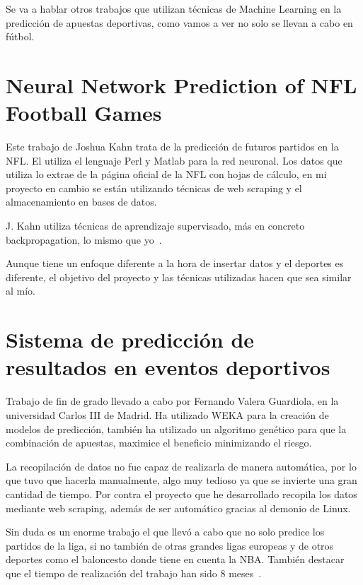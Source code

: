 
Se va a hablar otros trabajos que utilizan técnicas de Machine Learning en la predicción de apuestas deportivas, como vamos a ver no solo se llevan a cabo en fútbol.

\section{Neural Network Prediction of NFL Football Games}

Este trabajo de Joshua Kahn trata de la predicción de futuros partidos en la NFL.
El utiliza el lenguaje Perl y Matlab para la red neuronal. Los datos que utiliza lo extrae de la página oficial de la NFL con hojas de cálculo, en mi proyecto en cambio se están utilizando técnicas de web scraping y el almacenamiento en bases de datos.

J. Kahn utiliza técnicas de aprendizaje supervisado, más en concreto backpropagation, lo mismo que yo~\cite{neural_nfl}.

Aunque tiene un enfoque diferente a la hora de insertar datos y el deportes es diferente, el objetivo del proyecto y las técnicas utilizadas hacen que sea similar al mío.

\section{Sistema de predicción de resultados en eventos deportivos}

Trabajo de fin de grado llevado a cabo por Fernando Valera Guardiola, en la universidad Carlos III de Madrid. Ha utilizado WEKA para la creación de modelos de predicción, también ha utilizado un algoritmo genético para que la combinación de apuestas, maximice el beneficio minimizando el riesgo.

La recopilación de datos no fue capaz de realizarla de manera automática, por lo que tuvo que hacerla manualmente, algo muy tedioso ya que se invierte una gran cantidad de tiempo. Por contra el proyecto que he desarrollado recopila los datos mediante web scraping, además de ser automático gracias al demonio de Linux.

Sin duda es un enorme trabajo el que llevó a cabo que no solo predice los partidos de la liga, si no también de otras grandes ligas europeas y de otros deportes como el baloncesto donde tiene en cuenta la NBA. También destacar que el tiempo de realización del trabajo han sido 8 meses~\cite{apuestas_deportivas}.